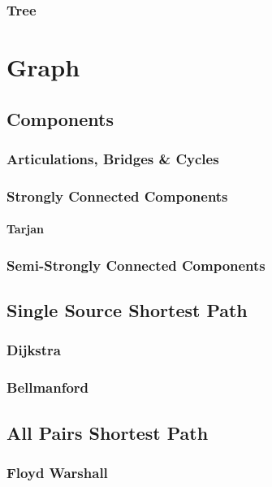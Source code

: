 \documentclass[10pt,a4paper]{report}
\begin{document}
		\subsection{Tree}
			
	
\chapter{Graph}
	\section{Components}
		\subsection{Articulations, Bridges \& Cycles}
		\newpage
		\subsection{Strongly Connected Components}
			\subsubsection{Tarjan}
				
		\subsection{Semi-Strongly Connected Components}
	\section{Single Source Shortest Path}
		\subsection{Dijkstra}
		\newpage
		\subsection{Bellmanford}
			
		
	\section{All Pairs Shortest Path}
		\subsection{Floyd Warshall}
		
\end{document}
